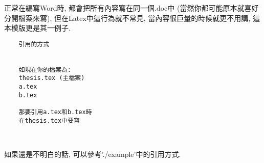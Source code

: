 
正常在編寫Word時, 都會把所有內容寫在同一個.doc中 (當然你都可能原本就喜好分開檔案來寫), 但在Latex中這行為就不常見, 當內容很巨量的時候就更不用講, 這本模版更是其一例子.

  \EmptyLine
  \begin{fmpage}{\textwidth}
  \begin{verbatim}
    引用的方式
    

    如現在你的檔案為:
    thesis.tex (主檔案)
    a.tex
    b.tex

    那要引用a.tex和b.tex時
    在thesis.tex中要寫
    
    
  \end{verbatim}
  \end{fmpage}
  \EmptyLine

如果還是不明白的話, 可以參考'./example'中的引用方式.

